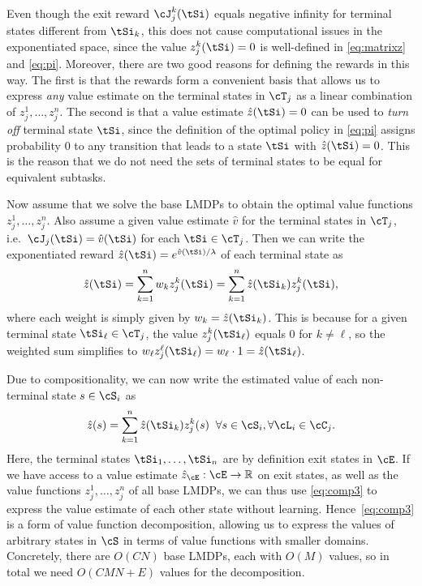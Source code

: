Even though the exit reward $\cJ_j^k(\tSi)$ equals negative infinity for terminal states different from $\tSi_k$, this does not cause computational issues in the exponentiated space, since the value $z_j^k(\tSi)=0$ is well-defined in \eqref{eq:matrixz} and \eqref{eq:pi}.
Moreover, there are two good reasons for defining the rewards in this way. The first is that the rewards form a convenient basis that allows us to express {\em any} value estimate on the terminal states in $\cT_j$ as a linear combination of $z_j^1,\ldots,z_j^n$.
The second is that a value estimate $\hat{z}(\tSi)=0$ can be used to {\em turn off} terminal state $\tSi$, since the definition of the optimal policy in \eqref{eq:pi} assigns probability $0$ to any transition that leads to a state $\tSi$ with $\hat{z}(\tSi)=0$. %
This is the reason that we do not need the sets of terminal states to be equal for equivalent subtasks.

Now assume that we solve the base LMDPs to obtain the optimal value functions $z_j^1,\ldots,z_j^n$. Also assume a given value estimate $\hat{v}$ for the terminal states in $\cT_j$, i.e.~$\cJ_j(\tSi)=\hat{v}(\tSi)$ for each $\tSi\in\cT_j$. Then we can write the exponentiated reward $\hat{z}(\tSi)=e^{\hat{v}(\tSi)/\lambda}$ of each terminal state as
\begin{equation}\label{eq:comp}
\hat{z}(\tSi) = \sum_{k=1}^n w_kz_j^k(\tSi) = \sum_{k=1}^n \hat{z}(\tSi_k) z_j^k(\tSi),
\end{equation}
where each weight is simply given by $w_k=\hat{z}(\tSi_k)$. This is because for a given terminal state $\tSi_\ell\in\cT_j$, the value $z_j^k(\tSi_\ell)$ equals $0$ for $k\neq \ell$, so the weighted sum simplifies to $w_\ell z_j^\ell(\tSi_\ell)=w_\ell\cdot 1=\hat{z}(\tSi_\ell)$.

Due to compositionality, we can now write the estimated value of each non-terminal state $s\in\cS_i$ as
\begin{align}\label{eq:comp3}
\hat{z}(s)=\sum_{k=1}^n \hat{z}(\tSi_k) z_j^k(s) \;\; \forall s\in\cS_i,\forall\cL_i\in\cC_j.
\end{align}
Here, the terminal states $\tSi_1,\ldots,\tSi_n$ are by definition exit states in $\cE$. If we have access to a value estimate $\hat{z}_\cE:\cE\rightarrow\mathbb{R}$ on exit states, as well as the value functions $z_j^1,\ldots,z_j^n$ of all base LMDPs, we can thus use \eqref{eq:comp3} to express the value estimate of each other state without learning. Hence~\eqref{eq:comp3} is a form of value function decomposition, allowing us to express the values of arbitrary states in $\cS$ in terms of value functions with smaller domains. Concretely, there are $O(CN)$ base LMDPs, each with $O(M)$ values, so in total we need $O(CMN+E)$ values for the decomposition.

